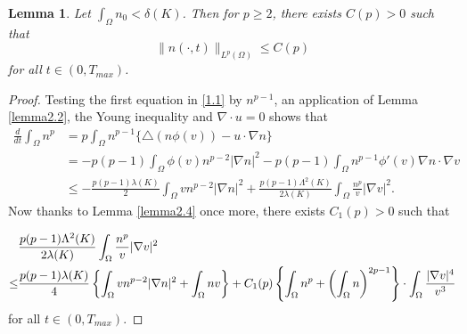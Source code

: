 \documentclass[12pt]{article}
\theoremstyle{plain}
\newtheorem{lemma}{Lemma}[section]
\theoremstyle{definition}
\numberwithin{equation}{section}
\begin{document}
\begin{lemma}\label{lemma3.6} Let $\int_\Omega n_0<\delta(K)$. Then for $p \geq  2$, there exists  $C(p)>0$ such that
\begin{equation}\label{3.20}
\|n(\cdot,t)\|_{L^p(\Omega)} \leq C(p)
\end{equation}
for all $t\in (0, T_{max})$.
\end{lemma}
\begin{proof}
Testing the first equation in \eqref{1.1} by $n^{p-1}$, an application of Lemma \ref{lemma2.2}, the Young inequality and $\nabla\cdot u=0$ shows that
\begin{equation}\label{3.21}
\begin{split}
\frac d{dt}\int_\Omega n^p&= p\int_\Omega n^{p-1}\{ \triangle(n\phi(v))-u\cdot \nabla n\}\\
&=-p(p-1) \int_\Omega \phi(v)n^{p-2}|\nabla n|^2-
p(p-1) \int_\Omega n^{p-1} \phi'(v)\nabla n\cdot \nabla v \\
 &\leq -\frac {p(p-1)\lambda(K)}2 \int_\Omega vn^{p-2}|\nabla n|^2+\frac {p(p-1)\Lambda^2(K)}{2\lambda(K)}
 \int_\Omega \frac{n^p}v |\nabla v|^2.
 \end{split}
\end{equation}
Now thanks to  Lemma \ref{lemma2.4} once more, there exists $C_1(p)>0$ such that

\begin{align}\label{3.22}
&\frac {p(p-1)\Lambda^2(K)}{2\lambda(K)} \int_\Omega \frac{n^p}v |\nabla v|^2\\
 \leq &\frac {p(p-1)\lambda(K)}4 \left\{\int_\Omega vn^{p-2}|\nabla n|^2+ \int_\Omega n v\right\}+
 C_1(p)\left\{\int_\Omega n^p+\left(\int_\Omega  n\right)^{2p-1} \right\}\cdot  \int_\Omega \frac{|\nabla v|^4}{v^3}\notag
\end{align}
for all $t\in (0, T_{max})$.


\end{proof}
\end{document}
